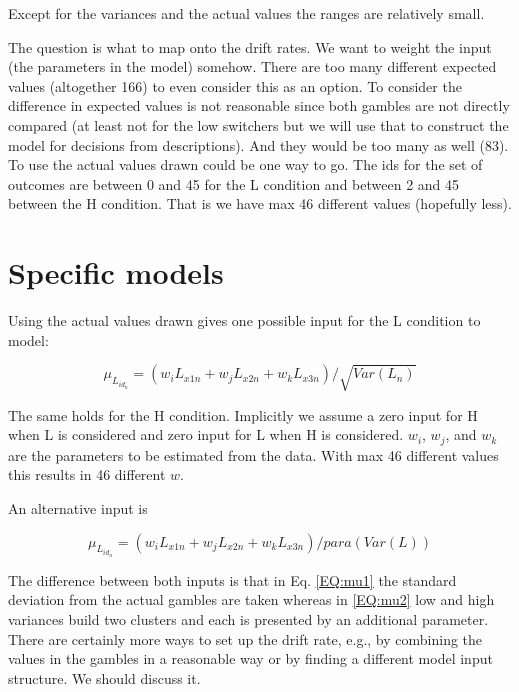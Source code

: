\documentclass[english,doc]{apa}
\begin{document}
\noindent Except for the variances and the actual values the ranges are relatively small. 

\noindent The question is what to map onto the drift rates. We want to weight the input (the parameters in the model) somehow.  There are too many different expected values (altogether 166) to even consider this as an option. To consider the difference in expected values is not reasonable since both gambles are not directly compared (at least not for the low switchers but we will use that to construct the model for decisions from descriptions). And they would be too many as well (83).  To use the actual values drawn could be one way to go. The  ids for the set of outcomes are between 0 and 45 for the L condition and between 2 and 45 between the H condition. That is we have max 46 different values (hopefully less). 
 
\section{Specific models}
\noindent Using the actual values drawn gives one possible input for the L condition to model:
 
\begin{equation} 
\mu_{L_{id_n}} = (w_{i} L_{x1n} + w_{j} L_{x2n} + w_{k} L_{x3n}) / \sqrt{Var(L_n)}  \label{EQ:mu1}
\end{equation}

\noindent The same holds for the H condition. Implicitly we assume a zero input for H when L is considered and zero input for L when H is considered. $w_i$, $w_j$, and $w_k$ are the parameters to be estimated from the data. With max 46 different values this results in 46 different $w$. 

An alternative input is 

 
\begin{equation} 
\mu_{L_{id_n}} = (w_{i} L_{x1n} + w_{j} L_{x2n} + w_{k} L_{x3n})/ para(Var(L))  \label{EQ:mu2}
\end{equation}

\noindent The difference between both inputs  is that in Eq. \ref{EQ:mu1}  the standard deviation from the actual gambles are taken whereas in  \ref{EQ:mu2} low and high variances build two clusters and each is presented by an additional parameter. There are certainly more ways to set up the drift rate, e.g., by combining the values in the gambles in a reasonable way or by finding a different model input structure. We should discuss it.  
\end{document}
